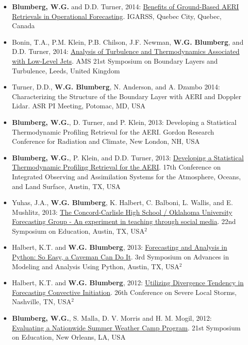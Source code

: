 \documentclass[10pt]{res} %
\begin{document}
\begin{resume}
\begin{itemize}
\item \textbf{Blumberg, W.G.} and D.D. Turner, 2014: \href{ftp://ftp.legos.obs-mip.fr/pub/tmp3m/IGARSS2014/abstracts/3989.pdf}{Benefits of Ground-Based AERI Retrievals in Operational Forecasting}. IGARSS, Quebec City, Quebec, Canada
\item Bonin, T.A., P.M. Klein, P.B. Chilson, J.F. Newman, \textbf{W.G. Blumberg}, and D.D. Turner, 2014: \href{https://ams.confex.com/ams/21BLT/webprogram/Paper248197.html}{Analysis of Turbulence and Thermodynamics Associated with Low-Level Jets}. AMS 21st Symposium on Boundary Layers and Turbulence, Leeds, United Kingdom
\item Turner, D.D., \textbf{W.G. Blumberg}, N. Anderson, and A. Dzambo  2014: Characterizing the Structure of the Boundary Layer with AERI and Doppler Lidar. ASR PI Meeting, Potomac, MD, USA
\item \textbf{Blumberg, W.G.}, D. Turner, and P. Klein, 2013: Developing a Statistical Thermodynamic Profiling Retrieval for the AERI. Gordon Research Conference for Radiation and Climate, New London, NH, USA
\item \textbf{Blumberg, W.G.}, P. Klein, and D.D. Turner, 2013: \href{https://ams.confex.com/ams/93Annual/webprogram/Paper217725.html}{Developing a Statistical Thermodynamic Profiling Retrieval for the AERI}. 17th Conference on Integrated Observing and Assimilation Systems for the Atmosphere, Oceans, and Land Surface, Austin, TX, USA 
\item Yuhas, J.A., \textbf{W.G. Blumberg}, K. Halbert, C. Balboni, L. Wallis, and E. Mushlitz, 2013: \href{https://ams.confex.com/ams/93Annual/webprogram/Paper221498.html}{The Concord-Carlisle High School / Oklahoma University Forecasting Group - An experiment in teaching through social media}. 22nd Symposium on Education, Austin, TX, USA$^{2}$
\item Halbert, K.T. and \textbf{W.G. Blumberg}, 2013: \href{https://ams.confex.com/ams/93Annual/webprogram/Paper213476.html}{Forecasting and Analysis in Python: So Easy, a Caveman Can Do It}. 3rd Symposium on Advances in Modeling and Analysis Using Python, Austin, TX, USA$^{2}$
\item Halbert, K.T. and \textbf{W.G. Blumberg}, 2012: \href{https://ams.confex.com/ams/26SLS/webprogram/Paper211764.html}{Utilizing Divergence Tendency in Forecasting Convective Initiation}. 26th Conference on Severe Local Storms, Nashville, TN, USA$^{2}$
\item \textbf{Blumberg, W.G.}, S. Malla, D. V. Morris and H. M. Mogil, 2012: \href{https://ams.confex.com/ams/92Annual/webprogram/Paper202144.html}{Evaluating a Nationwide Summer Weather Camp Program}. 21st Symposium on Education, New Orleans, LA, USA

\end{itemize}
\end{resume}
\end{document}
